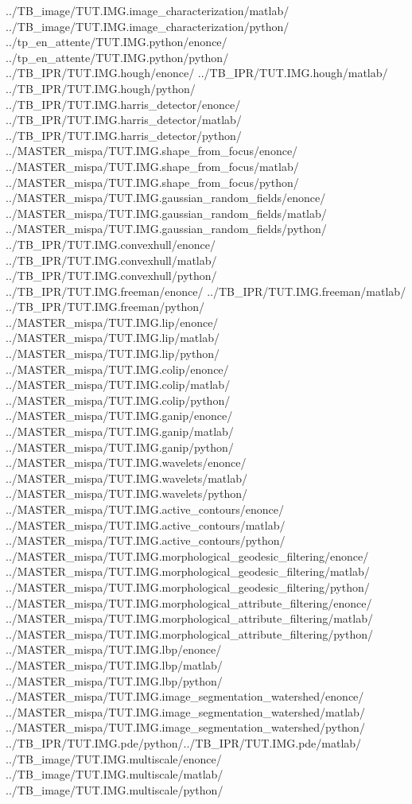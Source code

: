 {  {../TB_image/TUT.IMG.image_characterization/matlab/}
  {../TB_image/TUT.IMG.image_characterization/python/}
  {../tp_en_attente/TUT.IMG.python/enonce/}
  {../tp_en_attente/TUT.IMG.python/python/}
  {../TB_IPR/TUT.IMG.hough/enonce/}
  {../TB_IPR/TUT.IMG.hough/matlab/}
  {../TB_IPR/TUT.IMG.hough/python/}
  {../TB_IPR/TUT.IMG.harris_detector/enonce/}
  {../TB_IPR/TUT.IMG.harris_detector/matlab/}
  {../TB_IPR/TUT.IMG.harris_detector/python/}
  {../MASTER_mispa/TUT.IMG.shape_from_focus/enonce/}
  {../MASTER_mispa/TUT.IMG.shape_from_focus/matlab/}
  {../MASTER_mispa/TUT.IMG.shape_from_focus/python/}
  {../MASTER_mispa/TUT.IMG.gaussian_random_fields/enonce/}
  {../MASTER_mispa/TUT.IMG.gaussian_random_fields/matlab/}
  {../MASTER_mispa/TUT.IMG.gaussian_random_fields/python/}
  {../TB_IPR/TUT.IMG.convexhull/enonce/}
  {../TB_IPR/TUT.IMG.convexhull/matlab/}
  {../TB_IPR/TUT.IMG.convexhull/python/}
  {../TB_IPR/TUT.IMG.freeman/enonce/}  {../TB_IPR/TUT.IMG.freeman/matlab/} {../TB_IPR/TUT.IMG.freeman/python/}
  {../MASTER_mispa/TUT.IMG.lip/enonce/}
  {../MASTER_mispa/TUT.IMG.lip/matlab/}
  {../MASTER_mispa/TUT.IMG.lip/python/}
  {../MASTER_mispa/TUT.IMG.colip/enonce/}
  {../MASTER_mispa/TUT.IMG.colip/matlab/}
  {../MASTER_mispa/TUT.IMG.colip/python/}
  {../MASTER_mispa/TUT.IMG.ganip/enonce/}
  {../MASTER_mispa/TUT.IMG.ganip/matlab/}
  {../MASTER_mispa/TUT.IMG.ganip/python/}
  {../MASTER_mispa/TUT.IMG.wavelets/enonce/}
  {../MASTER_mispa/TUT.IMG.wavelets/matlab/}
  {../MASTER_mispa/TUT.IMG.wavelets/python/}
  {../MASTER_mispa/TUT.IMG.active_contours/enonce/}
  {../MASTER_mispa/TUT.IMG.active_contours/matlab/}
  {../MASTER_mispa/TUT.IMG.active_contours/python/}
  {../MASTER_mispa/TUT.IMG.morphological_geodesic_filtering/enonce/}
  {../MASTER_mispa/TUT.IMG.morphological_geodesic_filtering/matlab/}
  {../MASTER_mispa/TUT.IMG.morphological_geodesic_filtering/python/}
  {../MASTER_mispa/TUT.IMG.morphological_attribute_filtering/enonce/}
  {../MASTER_mispa/TUT.IMG.morphological_attribute_filtering/matlab/}
  {../MASTER_mispa/TUT.IMG.morphological_attribute_filtering/python/}
  {../MASTER_mispa/TUT.IMG.lbp/enonce/}  
  {../MASTER_mispa/TUT.IMG.lbp/matlab/} 
  {../MASTER_mispa/TUT.IMG.lbp/python/}  
  {../MASTER_mispa/TUT.IMG.image_segmentation_watershed/enonce/}
  {../MASTER_mispa/TUT.IMG.image_segmentation_watershed/matlab/}
  {../MASTER_mispa/TUT.IMG.image_segmentation_watershed/python/}
  {../TB_IPR/TUT.IMG.pde/python/}{../TB_IPR/TUT.IMG.pde/matlab/}
  {../TB_image/TUT.IMG.multiscale/enonce/}
  {../TB_image/TUT.IMG.multiscale/matlab/}
  {../TB_image/TUT.IMG.multiscale/python/}
}
